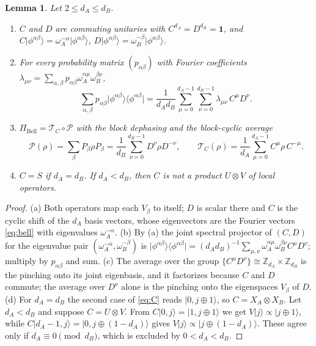 \documentclass[11pt,a4paper]{article}
\newtheorem{lemma}[theorem]{Lemma}
\theoremstyle{definition}
\theoremstyle{remark}
\newcommand{\ket}[1]{\lvert #1\rangle}
\newcommand{\ketbra}[2]{\lvert #1\rangle\langle #2\rvert}
\newcommand{\dA}{d_A}
\newcommand{\dB}{d_B}
\newcommand{\wA}{\omega_A}
\newcommand{\wB}{\omega_B}
\newcommand{\PiB}{\Pi_{\mathrm{Bell}}}
\newcommand{\cP}{\mathcal{P}}
\newcommand{\cC}{\mathcal{T}_{C}}
\newcommand{\id}{\mathbf{1}}
\newcommand{\phib}[2]{\phi^{#1#2}}
\begin{document}
\begin{lemma}\label{lem:CD}
Let $2\le\dA\le\dB$.
\begin{enumerate}
\item[(a)] $C$ and $D$ are commuting unitaries with $C^{\dA}=D^{\dB}=\id$, and
$C\ket{\phib\alpha\beta}=\wA^{-\alpha}\ket{\phib\alpha\beta}$,
$D\ket{\phib\alpha\beta}=\wB^{-\beta}\ket{\phib\alpha\beta}$.
\item[(b)] For every probability matrix $(p_{\alpha\beta})$ with Fourier coefficients
$\lambda_{\mu\nu}=\sum_{\alpha,\beta}p_{\alpha\beta}\wA^{\alpha\mu}\wB^{\beta\nu}$,
\begin{equation}\label{eq:fourier}
\sum_{\alpha,\beta}p_{\alpha\beta}\ketbra{\phib\alpha\beta}{\phib\alpha\beta}
=\frac{1}{\dA\dB}\sum_{\mu=0}^{\dA-1}\sum_{\nu=0}^{\dB-1}\lambda_{\mu\nu}\,C^{\mu}D^{\nu}.
\end{equation}
\item[(c)] $\PiB=\cC\circ\cP$ with the block dephasing and the block-cyclic average
\begin{equation}\label{eq:PC}
\cP(\rho)=\sum_{\beta}P_\beta\rho P_\beta=\frac{1}{\dB}\sum_{\nu=0}^{\dB-1}D^{\nu}\rho D^{-\nu},
\qquad
\cC(\rho)=\frac{1}{\dA}\sum_{\mu=0}^{\dA-1}C^{\mu}\rho\,C^{-\mu}.
\end{equation}
\item[(d)] $C=S$ if $\dA=\dB$. If $\dA<\dB$, then $C$ is not a product $U\otimes V$ of
local operators.
\end{enumerate}
\end{lemma}

\begin{proof}
(a) Both operators map each $V_\beta$ to itself; $D$ is scalar there and $C$ is the cyclic
shift of the $\dA$ basis vectors, whose eigenvectors are the Fourier vectors
\eqref{eq:bell} with eigenvalues $\wA^{-\alpha}$. (b) By (a) the joint spectral projector
of $(C,D)$ for the eigenvalue pair $(\wA^{-\alpha},\wB^{-\beta})$ is
$\ketbra{\phib\alpha\beta}{\phib\alpha\beta}
=(\dA\dB)^{-1}\sum_{\mu,\nu}\wA^{\alpha\mu}\wB^{\beta\nu}C^{\mu}D^{\nu}$; multiply by
$p_{\alpha\beta}$ and sum. (c) The average over the group
$\{C^{\mu}D^{\nu}\}\cong\mathbb{Z}_{\dA}\times\mathbb{Z}_{\dB}$ is the pinching onto its
joint eigenbasis, and it factorizes because $C$ and $D$ commute; the average over $D^\nu$
alone is the pinching onto the eigenspaces $V_\beta$ of $D$. (d) For $\dA=\dB$ the second
case of \eqref{eq:C} reads $\ket{0,j\oplus1}$, so $C=X_A\otimes X_B$. Let $\dA<\dB$ and
suppose $C=U\otimes V$. From $C\ket{0,j}=\ket{1,j\oplus1}$ we get
$V\ket{j}\propto\ket{j\oplus1}$, while $C\ket{\dA-1,j}=\ket{0,j\oplus(1-\dA)}$ gives
$V\ket{j}\propto\ket{j\oplus(1-\dA)}$. These agree only if $\dA\equiv0 \pmod{\dB}$, which
is excluded by $0<\dA<\dB$.
\end{proof}
\end{document}
